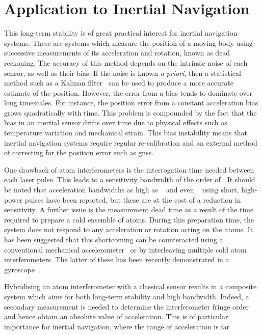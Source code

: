 \section{Application to Inertial Navigation}
This long-term stability is of great practical interest for inertial
navigation systems. These are systems which measure the position of a
moving body using successive measurements of its acceleration and
rotation, known as dead reckoning. The accuracy of this method depends
on the intrinsic noise of each sensor, as well as their bias. If the
noise is known \textit{a priori}, then a statistical method such as a
Kalman filter~\cite{Faruqi2000} can be used to produce a more accurate estimate of the
position. However, the error from a bias tends to dominate over long
timescales. For instance, the position
error from a constant acceleration bias grows quadratically with time.
This problem is compounded by the fact that the bias in an inertial
sensor drifts over time due to physical effects such as temperature
variation and mechanical strain. This bias instability means that
inertial navigation systems require regular re-calibration and an
external method of correcting for the position error such as
\ac{gnss}. 
\par\noindent
One drawback of atom interferometers is the interrogation time needed
between each laser pulse. This leads to a sensitivity bandwidth of the order of
. It should be noted that acceleration bandwidths as
high as 
~\cite{Rakholia2014a} and even
~\cite{Biedermann2017} using short, high-power
pulses
have been reported, but these are at the cost of a reduction in sensitivity.
A further issue is the measurement dead time as a result of the time
required to prepare a cold ensemble of atoms. During this preparation time, the system
does not respond to any acceleration or rotation acting on the atoms.
It has been suggested that this shortcoming can be counteracted using a
conventional mechanical accelerometer~\cite{JEKELI2005} or by
interleaving multiple cold atom interferometers. The latter of these
has been recently demonstrated in a gyroscope~\cite{Dutta2016}.
\par\noindent
Hybridising an atom interferometer with a classical
sensor results in a composite system which aims for both long-term
stability and high bandwidth. Indeed, a secondary
measurement is needed to determine the interferometer fringe order and hence obtain
an absolute value of acceleration. This is of particular importance
for inertial navigation, where the range of acceleration is far
